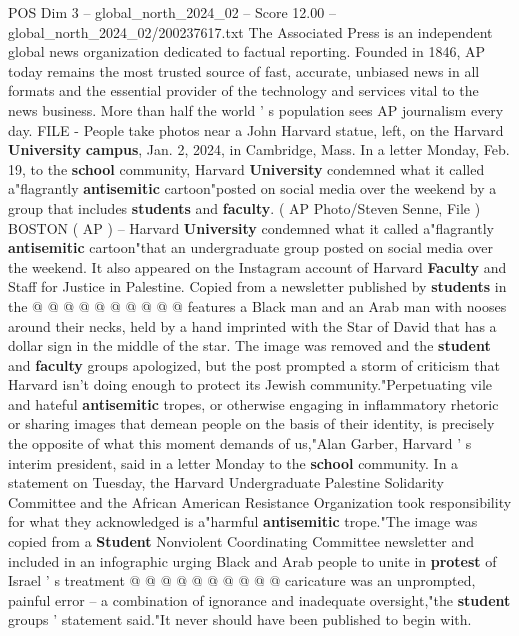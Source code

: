 \begin{textsample}{POS Dim 3 – global\_north\_2024\_02 – Score 12.00 – global\_north\_2024\_02/200237617.txt}  \label{ex:f3_pos_257}
The Associated Press is an independent global news organization dedicated to factual reporting.
Founded in 1846, AP today remains the most trusted source of fast, accurate, unbiased news in all formats and the essential provider of the technology and services vital to the news business.
More than half the world ' s population sees AP journalism every day.
FILE - People take photos near a John Harvard statue, left, on the Harvard \textbf{University} \textbf{campus}, Jan. 2, 2024, in Cambridge, Mass.
In a letter Monday, Feb. 19, to the \textbf{school} community, Harvard \textbf{University} condemned what it called a"flagrantly \textbf{antisemitic} cartoon"posted on social media over the weekend by a group that includes \textbf{students} and \textbf{faculty}. ( AP Photo/Steven Senne, File ) BOSTON ( AP ) -- Harvard \textbf{University} condemned what it called a"flagrantly \textbf{antisemitic} cartoon"that an undergraduate group posted on social media over the weekend.
It also appeared on the Instagram account of Harvard \textbf{Faculty} and Staff for Justice in Palestine.
Copied from a newsletter published by \textbf{students} in the @ @ @ @ @ @ @ @ @ @ features a Black man and an Arab man with nooses around their necks, held by a hand imprinted with the Star of David that has a dollar sign in the middle of the star.
The image was removed and the \textbf{student} and \textbf{faculty} groups apologized, but the post prompted a storm of criticism that Harvard isn't doing enough to protect its Jewish community."Perpetuating vile and hateful \textbf{antisemitic} tropes, or otherwise engaging in inflammatory rhetoric or sharing images that demean people on the basis of their identity, is precisely the opposite of what this moment demands of us,"Alan Garber, Harvard ' s interim president, said in a letter Monday to the \textbf{school} community.
In a statement on Tuesday, the Harvard Undergraduate Palestine Solidarity Committee and the African American Resistance Organization took responsibility for what they acknowledged is a"harmful \textbf{antisemitic} trope."The image was copied from a \textbf{Student} Nonviolent Coordinating Committee newsletter and included in an infographic urging Black and Arab people to unite in \textbf{protest} of Israel ' s treatment @ @ @ @ @ @ @ @ @ @ caricature was an unprompted, painful error -- a combination of ignorance and inadequate oversight,"the \textbf{student} groups ' statement said."It never should have been published to begin with.

\end{textsample}

